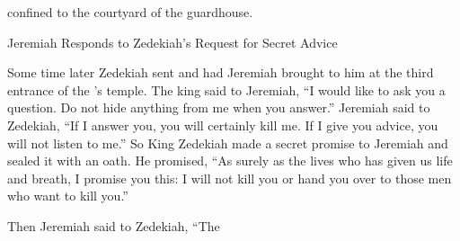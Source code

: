 {confined to the courtyard
of the guardhouse.
\par }{\SH Jeremiah Responds to Zedekiah’s Request for Secret Advice
\par }{\PP {}Some time later Zedekiah
sent
and had Jeremiah
brought
to
him
at the third
entrance
of the
{}’s
temple.
The king
said
to
Jeremiah,
“I
would like to ask
you a question.
Do not
hide
anything
from me when you answer.”
Jeremiah
said
to
Zedekiah,
“If
I answer you, you will certainly
kill
me. If
I give you advice,
you will not
listen
to me.”
So
King
Zedekiah
made
a secret
promise
to
Jeremiah
and sealed it with an oath.
He promised, “As surely
as the
{}
lives who has
given
us life
and breath, I promise you this: I will not
kill
you or
hand
you over to those
men
who
want
to kill you.”
\par }{\PP {}Then Jeremiah
said
to
Zedekiah,
“The

}
